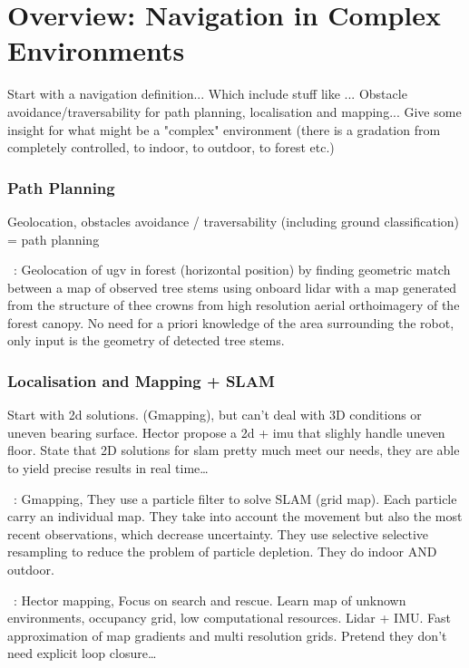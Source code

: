 \section{Overview: Navigation in Complex Environments}
\label{sec:literature_complex_environments}

Start with a navigation definition... Which include stuff like ... Obstacle avoidance/traversability for path planning, localisation and mapping... 
Give some insight for what might be a "complex" environment (there is a gradation from completely controlled, to indoor, to outdoor, to forest etc.)

\subsubsection{Path Planning}
Geolocation, obstacles avoidance / traversability (including ground classification) = path planning

~\cite{Hussein2015}:
Geolocation of ugv in forest (horizontal position) by finding geometric match between a map of observed tree stems using onboard lidar with a map generated from the structure of thee crowns from high resolution aerial orthoimagery of the forest canopy. No need for a priori knowledge of the area surrounding the robot, only input is the geometry of detected tree stems.

\subsubsection{Localisation and Mapping + SLAM}
Start with 2d solutions. (Gmapping), but can't deal with 3D conditions or uneven bearing surface. Hector propose a 2d + imu that slighly handle uneven floor.
State that 2D solutions for slam pretty much meet our needs, they are able to yield precise results in real time\dots

~\cite{Grisetti2007}: Gmapping,
They use a particle filter to solve SLAM (grid map). Each particle carry an individual map. They take into account the movement but also the most recent observations, which decrease uncertainty. They use selective selective resampling to reduce the problem of particle depletion. They do indoor AND outdoor. 

~\cite{Kohlbrecher2011}: Hector mapping,
Focus on search and rescue. Learn map of unknown environments, occupancy grid, low computational resources. Lidar + IMU. Fast approximation of map gradients and multi resolution grids. Pretend they don't need explicit loop closure\dots


